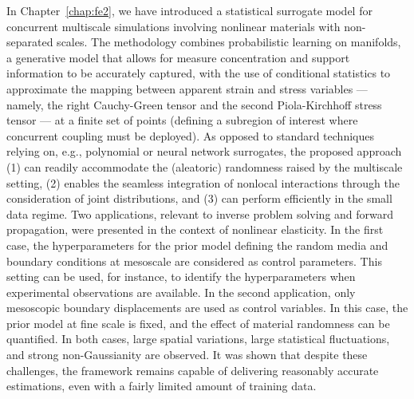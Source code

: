 In Chapter~\ref{chap:fe2}, we have introduced a statistical surrogate model for concurrent multiscale simulations involving nonlinear materials with non-separated scales. The methodology combines probabilistic learning on manifolds, a generative model that allows for measure concentration and support information to be accurately captured, with the use of conditional statistics to approximate the mapping between apparent strain and stress variables --- namely, the right Cauchy-Green tensor and the second Piola-Kirchhoff stress tensor --- at a finite set of points (defining a subregion of interest where concurrent coupling must be deployed). As opposed to standard techniques relying on, e.g., polynomial or neural network surrogates, the proposed approach (1) can readily accommodate the (aleatoric) randomness raised by the multiscale setting, (2) enables the seamless integration of nonlocal interactions through the consideration of joint distributions, and (3) can perform efficiently in the small data regime. Two applications, relevant to inverse problem solving and forward propagation, were presented in the context of nonlinear elasticity. In the first case, the hyperparameters for the prior model defining the random media and boundary conditions at mesoscale are considered as control parameters. This setting can be used, for instance, to identify the hyperparameters when experimental observations are available. In the second application, only mesoscopic boundary displacements are used as control variables. In this case, the prior model at fine scale is fixed, and the effect of material randomness can be quantified. In both cases, large spatial variations, large statistical fluctuations, and strong non-Gaussianity are observed. It was shown that despite these challenges, the framework remains capable of delivering reasonably accurate estimations, even with a fairly limited amount of training data.
